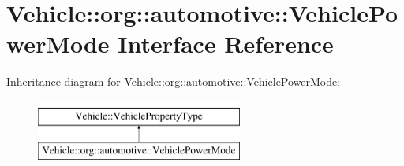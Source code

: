 \hypertarget{interfaceVehicle_1_1org_1_1automotive_1_1VehiclePowerMode}{\section{Vehicle\-:\-:org\-:\-:automotive\-:\-:Vehicle\-Power\-Mode Interface Reference}
\label{interfaceVehicle_1_1org_1_1automotive_1_1VehiclePowerMode}
}
Inheritance diagram for Vehicle\-:\-:org\-:\-:automotive\-:\-:Vehicle\-Power\-Mode\-:\begin{figure}[H]
\begin{center}
\leavevmode
\includegraphics[height=2.000000cm]{interfaceVehicle_1_1org_1_1automotive_1_1VehiclePowerMode}
\end{center}
\end{figure}
